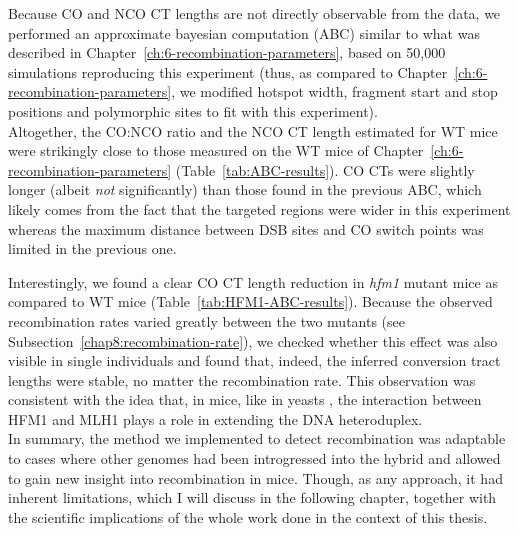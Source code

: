Because CO and NCO CT lengths are not directly observable from the data, we performed an approximate bayesian computation (ABC) similar to what was described in Chapter~\ref{ch:6-recombination-parameters}, based on 50,000 simulations reproducing this experiment (thus, as compared to Chapter~\ref{ch:6-recombination-parameters}, we modified hotspot width, fragment start and stop positions and polymorphic sites to fit with this experiment).\\




Altogether, the CO:NCO ratio and the NCO CT length estimated for WT mice were strikingly close to those measured on the WT mice of Chapter~\ref{ch:6-recombination-parameters} (Table~\ref{tab:ABC-results}).
CO CTs were slightly longer (albeit \textit{not} significantly) than those found in the previous ABC, which likely comes from the fact that the targeted regions were wider in this experiment whereas the maximum distance between DSB sites and CO switch points was limited in the previous one.

Interestingly, we found a clear CO CT length reduction in \textit{hfm1} mutant mice as compared to WT mice (Table~\ref{tab:HFM1-ABC-results}).
Because the observed recombination rates varied greatly between the two mutants (see Subsection~\ref{chap8:recombination-rate}), we checked whether this effect was also visible in single individuals and found that, indeed, the inferred conversion tract lengths were stable, no matter the recombination rate.
This observation was consistent with the idea that, in mice, like in yeasts \citep{duroc2017concerted}, the interaction between HFM1 and MLH1 plays a role in extending the DNA heteroduplex.\\


In summary, the method we implemented to detect recombination was adaptable to cases where other genomes had been introgressed into the hybrid and allowed to gain new insight into recombination in mice.
Though, as any approach, it had inherent limitations, which I will discuss in the following chapter, together with the scientific implications of the whole work done in the context of this thesis.



